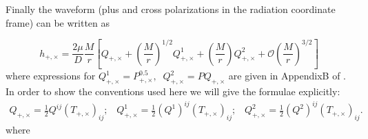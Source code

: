 \documentclass[11pt]{report}
\def\bea{\begin{eqnarray}}
\def\ena{\end{eqnarray}}
\begin{document}
Finally the waveform (plus and cross polarizations in the radiation
coordinate frame) can be written as 

\begin{equation}
h_{+,\times} = \frac{2\mu}{D}\frac{M}{r}\left[ 
Q_{+,\times}  + \left(\frac{M}{r}\right)^{1/2}Q^{1}_{+,\times} +
\left(\frac{M}{r}\right)Q^{2}_{+,\times}
 + {\mathcal O}\left(\frac{M}{r}\right)^{3/2}\right]
\end{equation}
where expressions for $Q^{1}_{+,\times} = P^{0.5}_{+,\times},\;\; Q^{2}_{+,\times} = PQ_{+,\times}$ are given in AppendixB of \cite{Kidder}. 
In order to show the conventions used here we will give the formulae explicitly:
\bea
Q_{+,\times} = \frac1{2} Q^{ij}(T_{+,\times})_{ij}; \;\;\;
Q^1_{+,\times} = \frac1{2} (Q^1)^{ij}(T_{+,\times})_{ij}; \;\;\;
Q^2_{+,\times} = \frac1{2} (Q^2)^{ij}(T_{+,\times})_{ij}.
\ena
where
\end{document}
